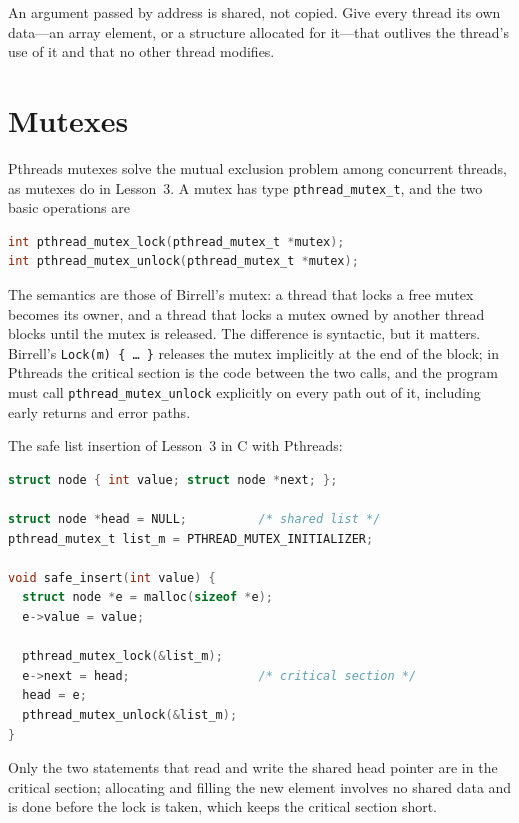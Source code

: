 \documentclass[../main.tex]{subfiles}
\begin{document}
\begin{keypoint}
  An argument passed by address is shared, not copied.  Give every thread
  its own data---an array element, or a structure allocated for it---that
  outlives the thread's use of it and that no other thread modifies.
\end{keypoint}

\section{Mutexes}
\label{sec:l04-mutex}

Pthreads mutexes solve the mutual exclusion problem among concurrent
threads, as mutexes do in Lesson~3.  A mutex has type
\texttt{pthread\_mutex\_t}, and the two basic operations are
\begin{lstlisting}[language=C, numbers=none]
int pthread_mutex_lock(pthread_mutex_t *mutex);
int pthread_mutex_unlock(pthread_mutex_t *mutex);
\end{lstlisting}
The semantics are those of Birrell's mutex: a thread that locks a free
mutex becomes its owner, and a thread that locks a mutex owned by another
thread blocks until the mutex is released.  The difference is syntactic, but
it matters.  Birrell's \texttt{Lock(m)~\{\,\ldots\,\}} releases the mutex
implicitly at the end of the block; in Pthreads the critical section is the
code between the two calls, and the program must call
\texttt{pthread\_mutex\_unlock} explicitly on every path out of it,
including early returns and error paths.

\begin{example}
  \label{ex:l04-safe-insert}
  The safe list insertion of Lesson~3 in C with Pthreads:
  \begin{lstlisting}[language=C, numbers=none]
struct node { int value; struct node *next; };

struct node *head = NULL;          /* shared list */
pthread_mutex_t list_m = PTHREAD_MUTEX_INITIALIZER;

void safe_insert(int value) {
  struct node *e = malloc(sizeof *e);
  e->value = value;

  pthread_mutex_lock(&list_m);
  e->next = head;                  /* critical section */
  head = e;
  pthread_mutex_unlock(&list_m);
}
\end{lstlisting}
  Only the two statements that read and write the shared head pointer are
  in the critical section; allocating and filling the new element involves
  no shared data and is done before the lock is taken, which keeps the
  critical section short.
\end{example}
\end{document}
